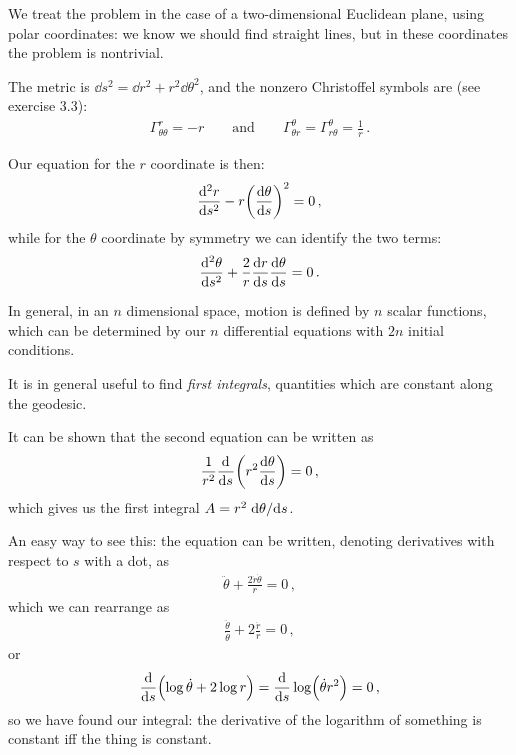 \documentclass[main.tex]{subfiles}
\begin{document}
We treat the problem in the case of a two-dimensional Euclidean plane, using polar coordinates: we know we should find straight lines, but in these coordinates the problem is nontrivial.

The metric is \(\dd{s^2} = \dd{r^2} + r^2 \dd{\theta^2}\), and the nonzero Christoffel symbols are (see exercise 3.3): 
%
\begin{align}
  \Gamma^{r}_{\theta \theta } = -r 
  \qquad \text{and} \qquad 
  \Gamma^{\theta }_{\theta r } = 
  \Gamma^{\theta }_{r \theta } = \frac{1}{r} 
\,.
\end{align}

Our equation for the \(r\) coordinate is then: 
%
\begin{align}
  \dv[2]{r}{s} - r \qty(\dv{\theta }{s})^2 = 0
\,,
\end{align}
%
while for the \(\theta \) coordinate by symmetry we can identify the two terms: 
%
\begin{align}
  \dv[2]{\theta }{s} + \frac{2}{r} \dv{r}{s} \dv{\theta }{s} =0
\,.
\end{align}

In general, in an \(n\) dimensional space, motion is defined by \(n\) scalar functions, which can be determined by our \(n\) differential equations with \(2n\) initial conditions.

It is in general useful to find \emph{first integrals}, quantities which are constant along the geodesic.

It can be shown that the second equation can be written as
%
\begin{align}
  \frac{1}{r^2} \dv[]{}{s} \qty(r^2 \dv{\theta }{s}) =0
\,,
\end{align}
%
which gives us the first integral \(A = r^2 \dv*{\theta }{s}\).

\begin{bluebox}
An easy way to see this: the equation can be written, denoting derivatives with respect to \(s\) with a dot, as 
%
\begin{align}
\ddot{\theta} + \frac{2 \dot{r} \dot{\theta}}{r} = 0
\,,
\end{align}
%
which we can rearrange as 
%
\begin{align}
\frac{ \ddot{\theta}}{\dot{\theta}}
+ 2 \frac{\dot{r}}{r} = 0
\,,
\end{align}
%
or 
%
\begin{align}
\dv{}{s} \qty( \log \dot{\theta} + 2 \log r) =
\dv{}{s} \log(\dot{\theta} r^2)
=0
\,,
\end{align}
%
so we have found our integral: the derivative of the logarithm of something is constant iff the thing is constant.
\end{bluebox} 
\end{document}
